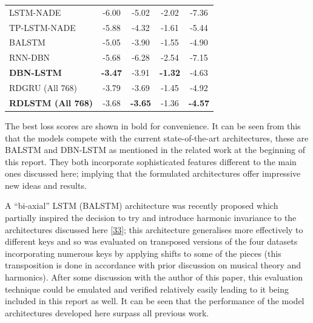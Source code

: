 \documentclass[12pt,]{article}
\begin{document}
\begin{table}[H]
\begin{tabular}{lcccc}
LSTM-NADE         & -6.00                 & -5.02             & -2.02               & -7.36                   \\
TP-LSTM-NADE      & -5.88                 & -4.32             & -1.61               & -5.44                   \\
BALSTM            & -5.05                 & -3.90             & -1.55               & -4.90                   \\
RNN-DBN           & -5.68                 & -6.28             & -2.54               & -7.15                   \\
\textbf{DBN-LSTM} & \textbf{-3.47}        & -3.91             & \textbf{-1.32}      & -4.63                   \\ 
\midrule
RDGRU (All 768)             & -3.79                 & -3.69             & -1.45               & -4.92                   \\
\textbf{RDLSTM (All 768)}   & -3.68                 & \textbf{-3.65}    & -1.36               & \textbf{-4.57}          \\
\bottomrule
\end{tabular}
\end{table}

The best loss scores are shown in bold for convenience. It can be seen
from this that the models compete with the current state-of-the-art
architectures, these are BALSTM and DBN-LSTM as mentioned in the related
work at the beginning of this report. They both incorporate
sophisticated features different to the main ones discussed here;
implying that the formulated architectures offer impressive new ideas
and results.

A ``bi-axial'' LSTM (BALSTM) architecture was recently proposed which
partially inspired the decision to try and introduce harmonic invariance
to the architectures discussed here
{[}\protect\hyperlink{ref-johnson2017generating}{33}{]}; this
architecture generalises more effectively to different keys and so was
evaluated on transposed versions of the four datasets incorporating
numerous keys by applying shifts to some of the pieces (this
transposition is done in accordance with prior discussion on musical
theory and harmonics). After some discussion with the author of this
paper, this evaluation technique could be emulated and verified
relatively easily leading to it being included in this report as well.
It can be seen that the performance of the model architectures developed
here surpass all previous work.
\end{document}
